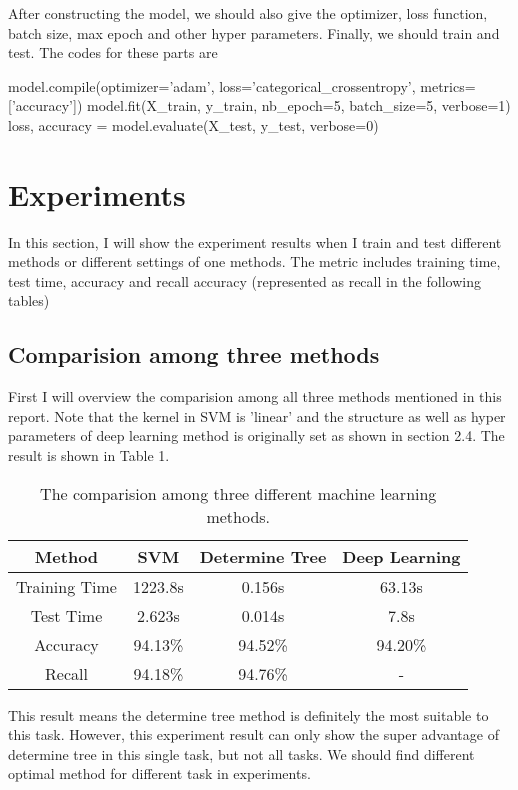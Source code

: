 \documentclass{article}
\begin{document}
After constructing the model, we should also give the optimizer, loss function, batch size, max epoch and other hyper parameters. Finally, we should train and test. The codes for these parts are
\begin{python}
     model.compile(optimizer='adam', loss='categorical_crossentropy', metrics=['accuracy'])
     model.fit(X_train, y_train, nb_epoch=5, batch_size=5, verbose=1)
     loss, accuracy =   model.evaluate(X_test, y_test, verbose=0)
\end{python}

\section{Experiments}
In this section, I will show the experiment results when I train and test different methods or different settings of one methods. The metric includes training time, test time, accuracy and recall accuracy (represented as recall in the following tables)

\subsection{Comparision among three methods}
First I will overview the comparision among all three methods mentioned in this report. Note that the kernel in SVM is 'linear' and the structure as well as hyper parameters of deep learning method is originally set as shown in section 2.4. The result is shown in Table 1.
\begin{table}[h]
     \centering
     \begin{tabular}{cccc}
         \hline
         Method & SVM & Determine Tree & Deep Learning \\
         \hline
         Training Time & 1223.8s & 0.156s & 63.13s \\
         Test Time & 2.623s & 0.014s & 7.8s \\
         Accuracy & 94.13\% & 94.52\% & 94.20\% \\
         Recall & 94.18\% & 94.76\% & - \\
         \hline
     \end{tabular}
     \caption{The comparision among three different machine learning methods.}
 \end{table}

 This result means the determine tree method is definitely the most suitable to this task. However, this experiment result can only show the super advantage of determine tree in this single task, but not all tasks. We should find different optimal method for different task in experiments.
\end{document}
